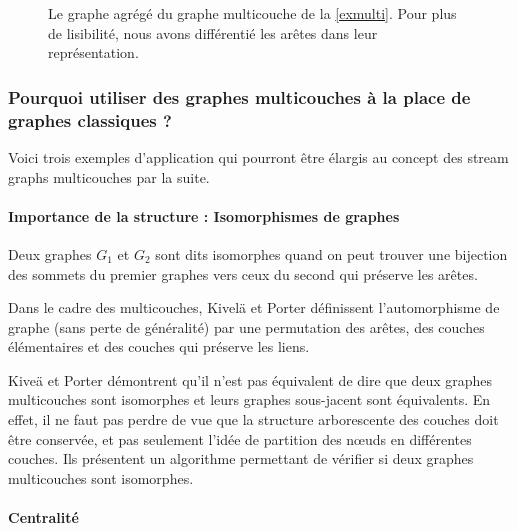 \documentclass[11pt,a4paper]{article}
\theoremstyle{definition}
\theoremstyle{remark}
\theoremstyle{remark}
\def \stgms {stream graphs multicouches}
\begin{document}
\begin{figure}[h]
\begin{center}
			\end{center}
	\caption{Le graphe agrégé du graphe multicouche de la \cref{exmulti}. Pour plus de lisibilité, nous avons différentié les arêtes dans leur représentation. }
	\label{agrege}
\end{figure}



\subsubsection{Pourquoi utiliser des graphes multicouches à la place de graphes classiques ?}

Voici trois exemples d'application qui pourront être élargis au concept des \stgms{} par la suite.


\paragraph{Importance de la structure : Isomorphismes de graphes}

Deux graphes $G_1$ et $G_2$ sont dits isomorphes quand on peut trouver une bijection des sommets du premier graphes vers ceux du second qui préserve les arêtes.

Dans le cadre des multicouches, Kivelä et Porter \cite{isoMulti} définissent l'automorphisme de graphe (sans perte de généralité) par une permutation des arêtes, des couches élémentaires et des couches qui préserve les liens.

Kiveä et Porter démontrent qu'il n'est pas équivalent de dire que deux graphes multicouches sont isomorphes et leurs graphes sous-jacent sont équivalents. En effet, il ne faut pas perdre de vue que la structure \og arborescente \fg{} des couches doit être conservée, et pas seulement l'idée de \og partition \fg{} des nœuds en différentes couches. Ils présentent un algorithme permettant de vérifier si deux graphes multicouches sont isomorphes.

\paragraph{Centralité}
\end{document}
